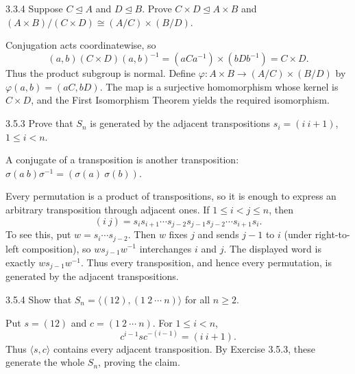 \documentclass[11pt,oneside]{article}
\begin{document}
\begin{exercise}{3.3.4}
Suppose $C\trianglelefteq A$ and $D\trianglelefteq B$. Prove $C\times D\trianglelefteq A\times B$ and $(A\times B)/(C\times D)\cong(A/C)\times(B/D)$.
\end{exercise}

\begin{solution}
Conjugation acts coordinatewise, so
\[
(a,b)(C\times D)(a,b)^{-1}=(aCa^{-1})\times(bDb^{-1})=C\times D.
\]
Thus the product subgroup is normal. Define $\varphi:A\times B\to(A/C)\times(B/D)$ by $\varphi(a,b)=(aC,bD)$. The map is a surjective homomorphism whose kernel is $C\times D$, and the First Isomorphism Theorem yields the required isomorphism.
\end{solution}

\begin{exercise}{3.5.3}
Prove that $S_n$ is generated by the adjacent transpositions $s_i=(i\ i+1)$, $1\le i<n$.
\end{exercise}

\begin{hint}
A conjugate of a transposition is another transposition: $\sigma(a\ b)\sigma^{-1}=(\sigma(a)\ \sigma(b))$.
\end{hint}

\begin{solution}
Every permutation is a product of transpositions, so it is enough to express an arbitrary transposition through adjacent ones. If $1\le i<j\le n$, then
\[
(i\ j)=s_i s_{i+1}\cdots s_{j-2}s_{j-1}s_{j-2}\cdots s_{i+1}s_i.
\]
To see this, put $w=s_i\cdots s_{j-2}$. Then $w$ fixes $j$ and sends $j-1$ to $i$ (under right-to-left composition), so $w s_{j-1}w^{-1}$ interchanges $i$ and $j$. The displayed word is exactly $w s_{j-1}w^{-1}$. Thus every transposition, and hence every permutation, is generated by the adjacent transpositions.
\end{solution}

\begin{exercise}{3.5.4}
Show that $S_n=\langle(12),(1\ 2\ \cdots\ n)\rangle$ for all $n\ge2$.
\end{exercise}

\begin{solution}
Put $s=(12)$ and $c=(1\ 2\ \cdots\ n)$. For $1\le i<n$,
\[
 c^{i-1}sc^{-(i-1)}=(i\ i+1).
\]
Thus $\langle s,c\rangle$ contains every adjacent transposition. By Exercise 3.5.3, these generate the whole $S_n$, proving the claim.
\end{solution}
\end{document}
